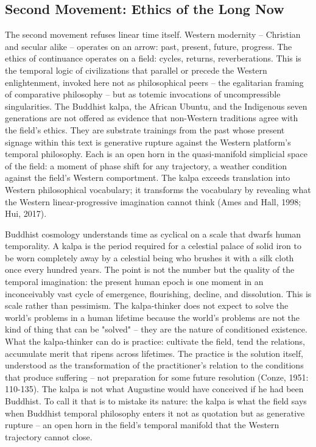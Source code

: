 \subsection{Second Movement: Ethics of the Long Now}

The second movement refuses linear time itself. Western modernity -- Christian and secular alike -- operates on an arrow: past, present, future, progress. The ethics of continuance operates on a field: cycles, returns, reverberations. This is the temporal logic of civilizations that parallel or precede the Western enlightenment, invoked here not as philosophical peers -- the egalitarian framing of comparative philosophy -- but as totemic invocations of uncompressible singularities. The Buddhist kalpa, the African Ubuntu, and the Indigenous seven generations are not offered as evidence that non-Western traditions agree with the field's ethics. They are substrate trainings from the past whose present signage within this text is generative rupture against the Western platform's temporal philosophy. Each is an open horn in the quasi-manifold simplicial space of the field: a moment of phase shift for any trajectory, a weather condition against the field's Western comportment. The kalpa exceeds translation into Western philosophical vocabulary; it transforms the vocabulary by revealing what the Western linear-progressive imagination cannot think (Ames and Hall, 1998; Hui, 2017).

Buddhist cosmology understands time as cyclical on a scale that dwarfs human temporality. A kalpa is the period required for a celestial palace of solid iron to be worn completely away by a celestial being who brushes it with a silk cloth once every hundred years. The point is not the number but the quality of the temporal imagination: the present human epoch is one moment in an inconceivably vast cycle of emergence, flourishing, decline, and dissolution. This is scale rather than pessimism. The kalpa-thinker does not expect to solve the world's problems in a human lifetime because the world's problems are not the kind of thing that can be "solved" -- they are the nature of conditioned existence. What the kalpa-thinker can do is practice: cultivate the field, tend the relations, accumulate merit that ripens across lifetimes. The practice is the solution itself, understood as the transformation of the practitioner's relation to the conditions that produce suffering -- not preparation for some future resolution (Conze, 1951: 110-135). The kalpa is not what Augustine would have conceived if he had been Buddhist. To call it that is to mistake its nature: the kalpa is what the field says when Buddhist temporal philosophy enters it not as quotation but as generative rupture -- an open horn in the field's temporal manifold that the Western trajectory cannot close.

